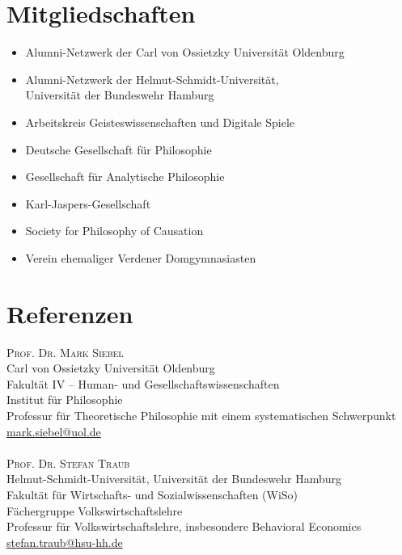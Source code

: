\documentclass[a4paper,10pt]{article}
\begin{document}
\section{Mitgliedschaften}
\begin{itemize}
   \item Alumni-Netzwerk der Carl von Ossietzky Universität Oldenburg
   \item Alumni-Netzwerk der Helmut-Schmidt-Universität,\\Universität der Bundeswehr Hamburg
   \item Arbeitskreis Geisteswissenschaften und Digitale Spiele
   \item Deutsche Gesellschaft für Philosophie
   \item Gesellschaft für Analytische Philosophie
   \item Karl-Jaspers-Gesellschaft
   \item Society for Philosophy of Causation
   \item Verein ehemaliger Verdener Domgymnasiasten
\end{itemize}


\clearpage
\section{Referenzen}
\textsc{Prof\hspace{0.5pt}. Dr\hspace{0.5pt}. Mark Siebel}\\
Carl von Ossietzky Universität Oldenburg\\
Fakultät IV -- Human- und Gesellschaftswissenschaften\\
Institut für Philosophie\\
Professur für Theoretische Philosophie mit einem systematischen Schwerpunkt\\
\href{mailto:mark.siebel@uol.de}{mark.siebel@uol.de}\\
\\
\textsc{Prof\hspace{0.5pt}. Dr\hspace{0.5pt}. Stefan Traub}\\
Helmut-Schmidt-Universität, Universität der Bundeswehr Hamburg\\
Fakultät für Wirtschafts- und Sozialwissenschaften (WiSo)\\
Fächergruppe Volkswirtschaftslehre\\
Professur für Volkswirtschaftslehre, insbesondere Behavioral Economics\\
\href{mailto:stefan.traub@hsu-hh.de}{stefan.traub@hsu-hh.de}\\
\end{document}

